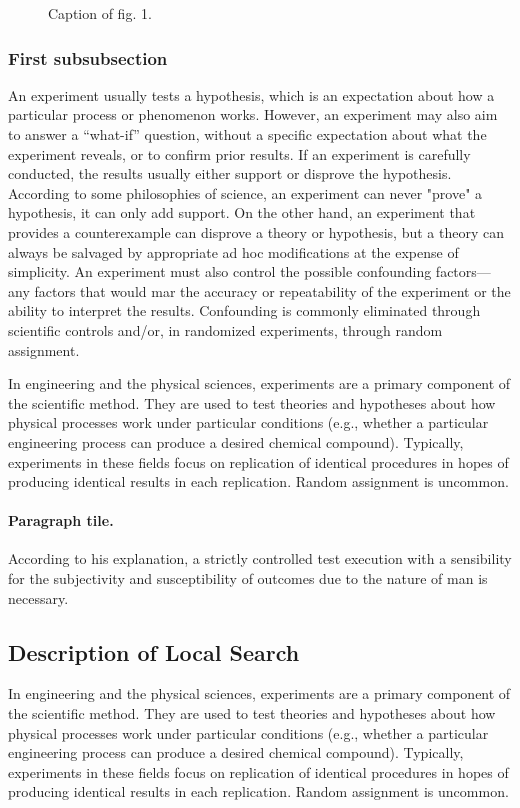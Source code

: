 \documentclass[11pt, a4paper]{article}
\begin{document}
\begin{figure}
	\centering
	\caption{Caption of fig. 1.}
	\label{fig:parabolic}
\end{figure}

\subsubsection{First subsubsection}
An experiment usually tests a hypothesis, which is an expectation about how a particular process or phenomenon works. However, an experiment may also aim to answer a ``what-if'' question, without a specific expectation about what the experiment reveals, or to confirm prior results. If an experiment is carefully conducted, the results usually either support or disprove the hypothesis. According to some philosophies of science, an experiment can never "prove" a hypothesis, it can only add support. On the other hand, an experiment that provides a counterexample can disprove a theory or hypothesis, but a theory can always be salvaged by appropriate ad hoc modifications at the expense of simplicity. An experiment must also control the possible confounding factors—any factors that would mar the accuracy or repeatability of the experiment or the ability to interpret the results. Confounding is commonly eliminated through scientific controls and/or, in randomized experiments, through random assignment.

In engineering and the physical sciences, experiments are a primary component of the scientific method. They are used to test theories and hypotheses about how physical processes work under particular conditions (e.g., whether a particular engineering process can produce a desired chemical compound). Typically, experiments in these fields focus on replication of identical procedures in hopes of producing identical results in each replication. Random assignment is uncommon.

\paragraph{Paragraph tile.}
According to his explanation, a strictly controlled test execution with a sensibility for the subjectivity and susceptibility of outcomes due to the nature of man is necessary.

\subsection{Description of Local Search}
In engineering and the physical sciences, experiments are a primary component of the scientific method. They are used to test theories and hypotheses about how physical processes work under particular conditions (e.g., whether a particular engineering process can produce a desired chemical compound). Typically, experiments in these fields focus on replication of identical procedures in hopes of producing identical results in each replication. Random assignment is uncommon.
\end{document}

